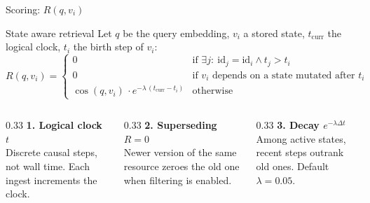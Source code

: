 \documentclass[aspectratio=169,10pt]{beamer}
\begin{document}
\begin{frame}{Scoring: $R(q,v_i)$}
  \begin{block}{State aware retrieval}
    Let $q$ be the query embedding, $v_i$ a stored state, $t_{\mathrm{curr}}$ the logical clock, $t_i$ the birth step of $v_i$:
    \[
      R(q,v_i)=
      \begin{cases}
        0 & \text{if }\exists j:\ \text{id}_j=\text{id}_i \land t_j>t_i\\[2pt]
        0 & \text{if } v_i \text{ depends on a state mutated after } t_i\\[2pt]
        \cos(q,v_i)\,\cdot e^{-\lambda\,(t_{\mathrm{curr}}-t_i)} & \text{otherwise}
      \end{cases}
    \]
  \end{block}
  \vspace{0.2em}
  \begin{columns}[T,onlytextwidth]
    \begin{column}{0.33\textwidth}
      \textbf{1. Logical clock $t$}\\[1pt]
      {\footnotesize Discrete causal steps, not wall time. Each ingest increments the clock.}
    \end{column}
    \begin{column}{0.33\textwidth}
      \textbf{2. Superseding $R=0$}\\[1pt]
      {\footnotesize Newer version of the same resource zeroes the old one when filtering is enabled.}
    \end{column}
    \begin{column}{0.33\textwidth}
      \textbf{3. Decay $e^{-\lambda\Delta t}$}\\[1pt]
      {\footnotesize Among active states, recent steps outrank old ones. Default $\lambda=0.05$.}
    \end{column}
  \end{columns}
\end{frame}
\end{document}
